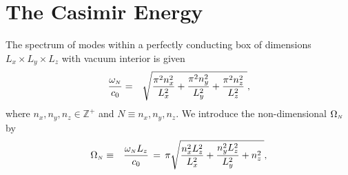 \documentclass[sections]{tjwNOTES}
\newcommand\nx{n_{x}}
\newcommand\ny{n_{y}}
\newcommand\nz{n_{z}}
\newcommand\Lx{L_{x}}
\newcommand\Ly{L_{y}}
\newcommand\Lz{L_{z}}
\newcommand\N{\mbox{\tiny $N$}}
\begin{document}
\section{The Casimir Energy}
The spectrum of modes within a perfectly conducting box of dimensions $\Lx\times\Ly\times\Lz$ with vacuum interior is given
\begin{eqnarray*}
    \frac{\omega_{\N}}{c_{0}} &=& \sqrt{ \frac{\pi^{2}\nx^{2}}{\Lx^{2}} + \frac{\pi^{2}\ny^{2}}{\Ly^{2}} + \frac{\pi^{2}\nz^{2}}{\Lz^{2}} \;},
\end{eqnarray*}
where $\nx,\ny,\nz\in\mathbb{Z}^{+}$ and $N\equiv \nx,\ny,\nz$. We introduce the non-dimensional $\Omega_{\N}$ by
\begin{eqnarray}\label{Om}
    \Omega_{\N} &\equiv& \frac{\omega_{\N}\Lz}{c_{0}} \,=\, \pi\sqrt{ \frac{\nx^{2}\Lz^{2}}{\Lx^{2}} + \frac{\ny^{2}\Lz^{2}}{\Ly^{2}} + \nz^{2} \;},
\end{eqnarray}
\end{document}

